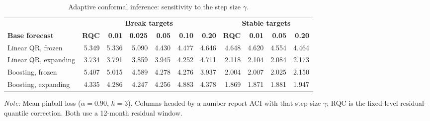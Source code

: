 \begin{table}[t]
\caption{Adaptive conformal inference: sensitivity to the step size $\gamma$.\label{tab:aci}}
\centering\footnotesize
\begin{tabular*}{\textwidth}{@{\extracolsep\fill}lrrrrrrrrrr@{}}
\toprule
 & \multicolumn{6}{c}{\textbf{Break targets}} & \multicolumn{4}{c}{\textbf{Stable targets}} \\
\cmidrule(lr){2-7}\cmidrule(l){8-11}
\textbf{Base forecast} & \textbf{RQC} & \textbf{0.01} & \textbf{0.025} & \textbf{0.05} & \textbf{0.10} & \textbf{0.20} & \textbf{RQC} & \textbf{0.01} & \textbf{0.05} & \textbf{0.20} \\
\midrule
Linear QR, frozen & 5.349 & 5.336 & 5.090 & 4.430 & 4.477 & 4.646 & 4.648 & 4.620 & 4.554 & 4.464 \\
Linear QR, expanding & 3.734 & 3.791 & 3.859 & 3.945 & 4.252 & 4.711 & 2.118 & 2.104 & 2.084 & 2.173 \\
Boosting, frozen & 5.407 & 5.015 & 4.589 & 4.278 & 4.276 & 3.937 & 2.004 & 2.007 & 2.025 & 2.150 \\
Boosting, expanding & 4.335 & 4.286 & 4.247 & 4.256 & 4.883 & 4.378 & 1.869 & 1.871 & 1.881 & 1.947 \\
\bottomrule
\end{tabular*}
\begin{tablenotes}
\item \textit{Note:} Mean pinball loss ($\alpha=0.90$, $h=3$). Columns headed by a number report ACI with that step size $\gamma$; RQC is the fixed-level residual-quantile correction. Both use a 12-month residual window.
\end{tablenotes}
\end{table}
